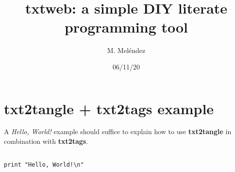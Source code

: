 \documentclass{article}
\title{txtweb: a simple DIY literate programming tool}
\author{M. Meléndez}
\begin{document}
\date{06/11/20}
\maketitle
\clearpage


\section*{txt2tangle + txt2tags example}

A \textit{Hello, World!} example should suffice to
explain how to use \textbf{txt2tangle} in combination
with \textbf{txt2tags}.

\begin{verbatim}

print "Hello, World!\n"

\end{verbatim}

\end{document}
